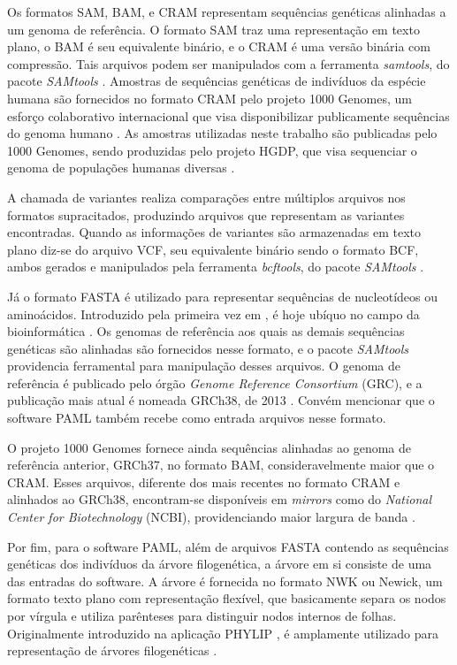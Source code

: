 \documentclass[cic,tc]{iiufrgs}
\begin{document}
Os formatos SAM, BAM, e CRAM representam sequências genéticas alinhadas a um
genoma de referência. O formato SAM traz uma representação em texto plano, o
BAM é seu equivalente binário, e o CRAM é uma versão binária com compressão.
Tais arquivos podem ser manipulados com a ferramenta \textit{samtools}, do pacote
\textit{SAMtools} \cite{danecek2021twelve}. Amostras de sequências genéticas de
indivíduos da espécie humana são fornecidos no formato CRAM pelo projeto 1000
Genomes, um esforço colaborativo internacional que visa disponibilizar
publicamente sequências do genoma humano \cite{via20101000}. As amostras
utilizadas neste trabalho são publicadas pelo 1000 Genomes, sendo produzidas
pelo projeto HGDP, que visa sequenciar o genoma de populações humanas diversas
\cite{cavalli2005human}.

A chamada de variantes realiza comparações entre múltiplos arquivos nos
formatos supracitados, produzindo arquivos que representam as variantes
encontradas. Quando as informações de variantes são armazenadas em texto plano
diz-se do arquivo VCF, seu equivalente binário sendo o formato BCF, ambos
gerados e manipulados pela ferramenta \textit{bcftools}, do pacote
\textit{SAMtools} \cite{danecek2021twelve}.

Já o formato FASTA é utilizado para representar sequências
de nucleotídeos ou aminoácidos. Introduzido pela primeira vez em
\cite{fasta}, é hoje ubíquo no campo da
bioinformática \cite{shen2016seqkit}. Os genomas de referência aos quais as
demais sequências genéticas são alinhadas são fornecidos nesse formato, e o
pacote \textit{SAMtools} providencia ferramental para manipulação desses arquivos. O
genoma de referência é publicado pelo órgão \textit{Genome Reference
Consortium} (GRC), e a publicação mais atual é nomeada GRCh38, de
2013 \cite{GUO201783}. Convém mencionar que o software PAML também recebe
como entrada arquivos nesse formato.

O projeto 1000 Genomes fornece ainda sequências alinhadas ao genoma de
referência anterior, GRCh37, no formato BAM, consideravelmente maior que o
CRAM. Esses arquivos, diferente dos mais recentes no formato CRAM e alinhados
ao GRCh38, encontram-se disponíveis em \textit{mirrors} como do
\textit{National Center for Biotechnology} (NCBI), providenciando maior largura
de banda \cite{clarke20121000}.

Por fim, para o software PAML, além de arquivos FASTA contendo as sequências
genéticas dos indivíduos da árvore filogenética, a árvore em si consiste de uma
das entradas do software. A árvore é fornecida no formato NWK ou Newick, um
formato texto plano com representação flexível, que basicamente separa os nodos
por vírgula e utiliza parênteses para distinguir nodos internos de folhas.
Originalmente introduzido na aplicação PHYLIP \cite{felsenstein1993phylip}, é
amplamente utilizado para representação de árvores filogenéticas \cite{fredslund2006phy}.
\end{document}
